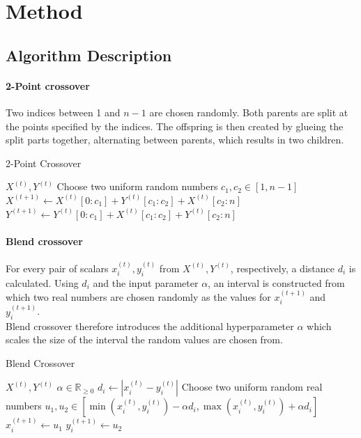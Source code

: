 \section{Method}
\subsection{Algorithm Description}
\paragraph{2-Point crossover}
Two indices between 1 and $n-1$ are chosen randomly.
Both parents are split at the points specified by the indices.
The offspring is then created by glueing the split parts together, alternating between parents, which results in two children.
\begin{algorithm}
\caption{2-Point Crossover}\label{alg:2px}
\begin{algorithmic}

\Require $X^{(t)}, Y^{(t)}$
\State Choose two uniform random numbers $c_1, c_2 \in [1, n-1]$
\State $X^{(t+1)} \gets X^{(t)}[0:c_1] + Y^{(t)}[c_1:c_2] + X^{(t)}[c_2:n]$
\State $Y^{(t+1)} \gets Y^{(t)}[0:c_1] + X^{(t)}[c_1:c_2] + Y^{(t)}[c_2:n]$

\end{algorithmic}
\end{algorithm}

\paragraph{Blend crossover}
For every pair of scalars $x_i^{(t)}, y_i^{(t)}$ from $X^{(t)}, Y^{(t)}$, respectively, a distance $d_i$ is calculated.
Using $d_i$ and the input parameter $\alpha$, an interval is constructed from which two real numbers are chosen randomly as the values for $x_i^{(t+1)}$ and $y_i^{(t+1)}$. \\
Blend crossover therefore introduces the additional hyperparameter $\alpha$ which scales the size of the interval the random values are chosen from.
\begin{algorithm}
\caption{Blend Crossover}\label{alg:blendx}
\begin{algorithmic}

\Require $X^{(t)}, Y^{(t)}$
\Ensure $\alpha \in \mathbb{R}_{\geq 0}$
    \State $d_i \gets |x_i^{(t)} -  y_i^{(t)}|$
    \State Choose two uniform random real numbers
    \State $u_1, u_2 \in [\min(x_i^{(t)}, y_i^{(t)}) - \alpha d_i, \max(x_i^{(t)}, y_i^{(t)}) + \alpha d_i]$
    \State $x_i^{(t+1)} \gets u_1$
    \State $y_i^{(t+1)} \gets u_2$
\EndFor

\end{algorithmic}
\end{algorithm}

